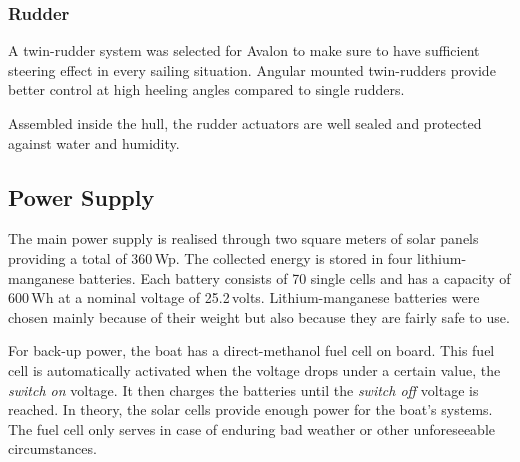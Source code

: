 \subsubsection{Rudder}
A twin-rudder system was selected for {\sc Avalon} to make sure to
have sufficient steering effect in every sailing situation. Angular
mounted twin-rudders provide better control at high
heeling angles compared to single rudders.

Assembled inside the hull, the rudder actuators are well sealed and
protected against water and humidity.

%
\subsection{Power Supply}
The main power supply is realised through two square meters of solar panels providing
a total of 360\,Wp. The collected energy is stored in four lithium-manganese
batteries. Each battery consists of 70 single cells and has a capacity of
600\,Wh at a nominal voltage of 25.2\,volts. Lithium-manganese batteries were
chosen mainly because of their weight but also because they are fairly safe to
use.

For back-up power, the boat has a direct-methanol fuel cell on
board. This fuel cell is automatically activated when the voltage
drops under a certain value, the \emph{switch on} voltage. It then
charges the batteries until the \emph{switch off} voltage is
reached. In theory, the solar cells provide enough power for the
boat's systems. The fuel cell only serves in case of enduring bad
weather  or other unforeseeable circumstances.


